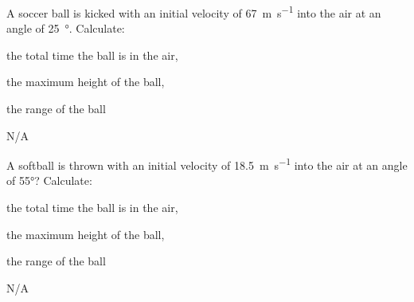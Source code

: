 \begin{question}[ID=upwardly-C-Q05,topic=projectiles,difficulty=C]
    A soccer ball is kicked with an initial velocity
        of \SI{67}{\meter\per\second} into the air at an angle
        of \SI{25}{\degree}.
    Calculate:
    \begin{enumerate*}[label=\arabic*)]
        \item the total time the ball is in the air,
        \item the maximum height of the ball,
        \item the range of the ball
    \end{enumerate*}
\end{question}
\begin{solution}
    N/A
\end{solution}


\begin{question}[ID=upwardly-C-Q06,topic=projectiles,difficulty=C]
    A softball is thrown with an initial velocity of \SI{18.5}{\meter\per\second}
        into the air at an angle of \ang{55}?
    Calculate:
    \begin{enumerate*}[label=\arabic*)]
        \item the total time the ball is in the air,
        \item the maximum height of the ball,
        \item the range of the ball
    \end{enumerate*}
\end{question}
\begin{solution}
    N/A
\end{solution}


\endinput

